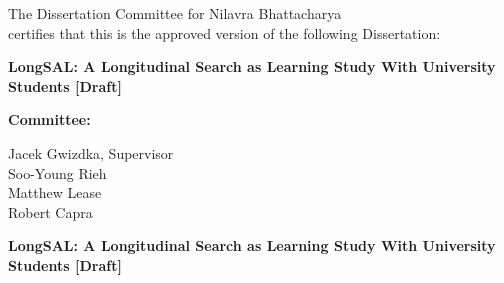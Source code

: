 \documentclass[letterpaper, nobind]{templates/ociamthesis}
\begin{document}
\begin{romanpages}



\begin{center}
  The Dissertation Committee for Nilavra Bhattacharya\\
  certifies that this is the approved version of the following Dissertation:\\
  \vspace*{30pt}
  \begin{spacing}{2}
    {\Large{\textbf{LongSAL: A Longitudinal Search as Learning Study With University Students {[}Draft{]}}}}
  \end{spacing}
\end{center}

\vspace*{55pt}

\phantom{x}\hspace{45ex} {\large{\textbf{Committee:}}}\\

\begin{flushright}
  Jacek Gwizdka, Supervisor\\
  \vspace*{24pt}
  Soo-Young Rieh\\
  \vspace*{24pt}
  Matthew Lease\\
  \vspace*{24pt}
  Robert Capra
\end{flushright}


\newpage
\begin{center}
  
  \begin{spacing}{2}
    {\Large{\textbf{LongSAL: A Longitudinal Search as Learning Study With University Students {[}Draft{]}}}}
  \end{spacing}
  

\end{center}
\end{romanpages}
\end{document}
